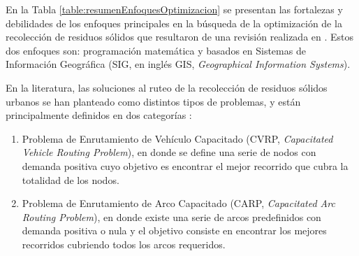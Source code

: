 
En la Tabla \ref{table:resumenEnfoquesOptimizacion} se presentan las fortalezas y debilidades de los enfoques principales en la búsqueda de la optimización de la recolección de residuos sólidos que resultaron de una revisión realizada en \cite{Sulemana2018OptimalMethods}. Estos dos enfoques son: programación matemática y basados en Sistemas de Información Geográfica (SIG, en inglés GIS, \textit{Geographical Information Systems}).

En la literatura, las soluciones al ruteo de la recolección de residuos sólidos urbanos se han planteado como distintos tipos de problemas, y están principalmente definidos en dos categorías \citep{Tirkolaee2018ATime}:

\begin{enumerate}[label=\alph*)]
    \item Problema de Enrutamiento de Vehículo Capacitado (CVRP, \textit{Capacitated Vehicle Routing Problem}), en donde se define una serie de nodos con demanda positiva cuyo objetivo es encontrar el mejor recorrido que cubra la totalidad de los nodos.
    \item Problema de Enrutamiento de Arco Capacitado (CARP, \textit{Capacitated Arc Routing Problem}), en donde existe una serie de arcos predefinidos con demanda positiva o nula y el objetivo consiste en encontrar los mejores recorridos cubriendo todos los arcos requeridos.
\end{enumerate}

